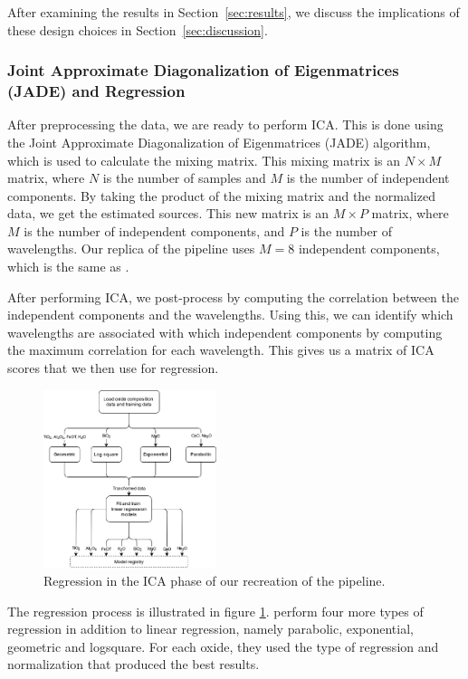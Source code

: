 After examining the results in Section~\ref{sec:results}, we discuss the implications of these design choices in Section~\ref{sec:discussion}.


\subsubsection{Joint Approximate Diagonalization of Eigenmatrices (JADE) and Regression}
After preprocessing the data, we are ready to perform ICA.
This is done using the Joint Approximate Diagonalization of Eigenmatrices (JADE) algorithm, which is used to calculate the mixing matrix.
This mixing matrix is an $N \times M$ matrix, where $N$ is the number of samples and $M$ is the number of independent components.
By taking the product of the mixing matrix and the normalized data, we get the estimated sources.
This new matrix is an $M \times P$ matrix, where $M$ is the number of independent components, and $P$ is the number of wavelengths.
Our replica of the pipeline uses $M = 8$ independent components, which is the same as \citet{cleggRecalibrationMarsScience2017}.

After performing ICA, we post-process by computing the correlation between the independent components and the wavelengths.
Using this, we can identify which wavelengths are associated with which independent components by computing the maximum correlation for each wavelength.
This gives us a matrix of ICA scores that we then use for regression.

\begin{figure}
	\centering
	\includegraphics[width=0.45\textwidth]{images/ica_regression.png}
	\caption{Regression in the ICA phase of our recreation of the pipeline.}
	\label{fig:ica_regression}
\end{figure}

The regression process is illustrated in figure \ref{fig:ica_regression}.
\citet{cleggRecalibrationMarsScience2017} perform four more types of regression in addition to linear regression, namely parabolic, exponential, geometric and logsquare.
For each oxide, they used the type of regression and normalization that produced the best results.

